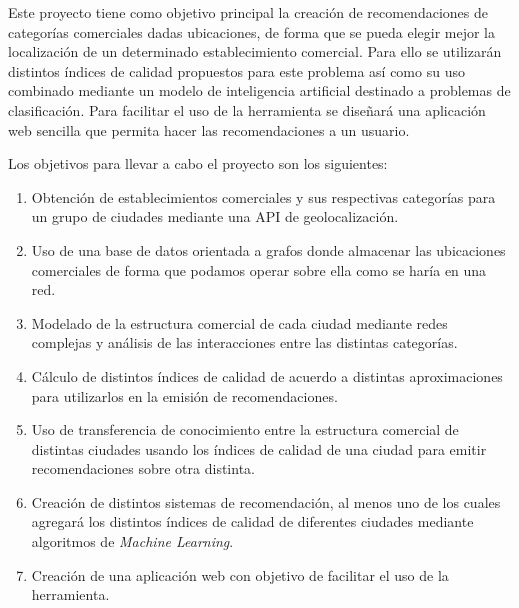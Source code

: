 

Este proyecto tiene como objetivo principal la creación de recomendaciones de categorías comerciales dadas ubicaciones, de forma que se pueda elegir mejor la localización de un determinado establecimiento comercial. Para ello se utilizarán distintos índices de calidad propuestos para este problema así como su uso combinado mediante un modelo de inteligencia artificial destinado a problemas de clasificación. Para facilitar el uso de la herramienta se diseñará una aplicación web sencilla que permita hacer las recomendaciones a un usuario.

Los objetivos para llevar a cabo el proyecto son los siguientes:

\begin{enumerate}
	\item Obtención de establecimientos comerciales y sus respectivas categorías para un grupo de ciudades mediante una API de geolocalización.
	\item Uso de una base de datos orientada a grafos donde almacenar las ubicaciones comerciales de forma que podamos operar sobre ella como se haría en una red.
	\item Modelado de la estructura comercial de cada ciudad mediante redes complejas y análisis de las interacciones entre las distintas categorías.
	\item Cálculo de distintos índices de calidad de acuerdo a distintas aproximaciones para utilizarlos en la emisión de recomendaciones.
	\item Uso de transferencia de conocimiento entre la estructura comercial de distintas ciudades usando los índices de calidad de una ciudad para emitir recomendaciones sobre otra distinta.
	\item Creación de distintos sistemas de recomendación, al menos uno de los cuales agregará los distintos índices de calidad de diferentes ciudades mediante algoritmos de \textit{Machine Learning}.
	\item Creación de una aplicación web con objetivo de facilitar el uso de la herramienta.
\end{enumerate}

